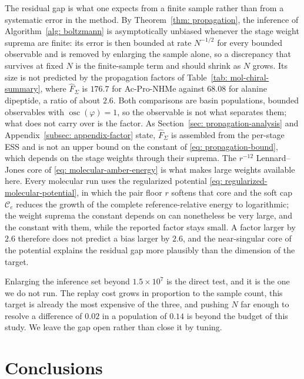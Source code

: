 \documentclass{article}
\begin{document}
The residual gap is what one expects from a finite sample rather than from a systematic error in the method. By Theorem~\ref{thm: propagation}, {\color{purple}the inference of Algorithm~\ref{alg: boltzmann}} is asymptotically unbiased {\color{blue}whenever the stage weight suprema are finite}: its error is {\color{blue}then} bounded at rate \(N^{-1/2}\) for every bounded observable and is removed by enlarging the sample alone, so a discrepancy that survives at fixed \(N\) is the finite-sample term and should shrink as \(N\) grows. Its size is not predicted by the propagation factors of Table~\ref{tab: mol-chiral-summary}, where \(\hat F_\Sigma\) is \(176.7\) for Ac-Pro-NHMe against \(68.08\) for alanine dipeptide, a ratio of about \(2.6\). Both comparisons are basin populations, bounded observables with \(\operatorname{osc}(\varphi)=1\), so the observable is not what separates them; what does not carry over is the factor. As Section~\ref{sec: propagation-analysis} and Appendix~\ref{subsec: appendix-factor} state, \(\hat F_\Sigma\) is assembled from the per-stage ESS and is not an upper bound on the constant of \eqref{eq: propagation-bound}, which depends on the stage weights through their suprema. The \(r^{-12}\) Lennard--Jones core of \eqref{eq: molecular-amber-energy} is what makes large weights available here. {\color{blue}Every molecular run uses the regularized potential \eqref{eq: regularized-molecular-potential}, in which the pair floor \(r\) softens that core and the soft cap \(\mathcal C_e\) reduces the growth of the complete reference-relative energy to logarithmic; the weight suprema the constant depends on can nonetheless be very large, and the constant with them,} while the reported factor stays small. A factor larger by \(2.6\) therefore does not predict a bias larger by \(2.6\), and the near-singular core of the potential explains the residual gap more plausibly than the dimension of the target.

Enlarging the inference set beyond \(1.5\times10^7\) is the direct test, and it is the one we do not run. The replay cost grows in proportion to the sample count, this target is already the most expensive of the three, and pushing \(N\) far enough to resolve a difference of \(0.02\) in a population of \(0.14\) is beyond the budget of this study. We leave the gap open rather than close it by tuning.


\section{Conclusions}
\label{sec: conclusions}
\end{document}
